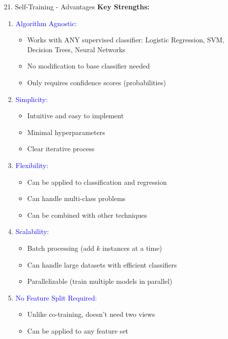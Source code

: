 \documentclass[8pt]{beamer}
\begin{document}
	\begin{frame}{21. Self-Training - Advantages}
		\fontsize{6.5}{7.5}\selectfont
		\textbf{Key Strengths:}
		
		\begin{enumerate}
			\item \textcolor{blue}{Algorithm Agnostic:}
			\begin{itemize}
				\item Works with ANY supervised classifier: Logistic Regression, SVM, Decision Trees, Neural Networks
				\item No modification to base classifier needed
				\item Only requires confidence scores (probabilities)
			\end{itemize}
			
			\item \textcolor{blue}{Simplicity:}
			\begin{itemize}
				\item Intuitive and easy to implement
				\item Minimal hyperparameters
				\item Clear iterative process
			\end{itemize}
			
			\item \textcolor{blue}{Flexibility:}
			\begin{itemize}
				\item Can be applied to classification and regression
				\item Can handle multi-class problems
				\item Can be combined with other techniques
			\end{itemize}
			
			\item \textcolor{blue}{Scalability:}
			\begin{itemize}
				\item Batch processing (add $k$ instances at a time)
				\item Can handle large datasets with efficient classifiers
				\item Parallelizable (train multiple models in parallel)
			\end{itemize}
			
			\item \textcolor{blue}{No Feature Split Required:}
			\begin{itemize}
				\item Unlike co-training, doesn't need two views
				\item Can be applied to any feature set
			\end{itemize}
		\end{enumerate}
	\end{frame}
	
\end{document}
